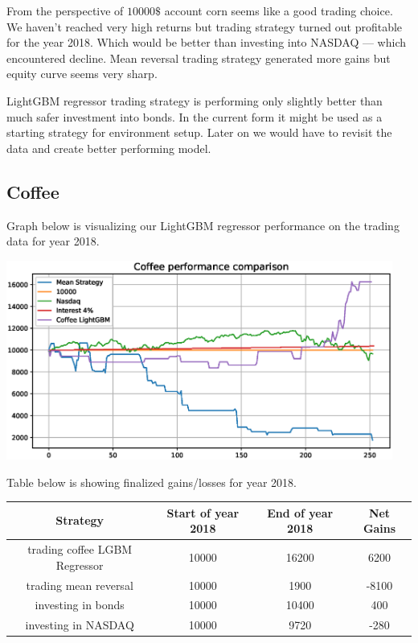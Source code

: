 \documentclass[final,2p]{elsarticle}
\begin{document}
From the perspective of $10000\$$ account corn seems like a good trading choice. We haven't reached
very high returns but trading strategy turned out profitable for the year 2018. Which would be
better than investing into NASDAQ --- which encountered decline. Mean reversal trading strategy generated
more gains but equity curve seems very sharp.

LightGBM regressor trading strategy is performing only slightly better than much safer investment
into bonds. In the current form it might be used as a starting strategy for environment setup.
Later on we would have to revisit the data and create better performing model.

\subsection{Coffee}

Graph below is visualizing our LightGBM regressor performance on the trading data for year 2018.

\begin{center}
\includegraphics[width = 5in]{figures/coffee_benchmark_performance.eps}
\end{center}

Table below is showing finalized gains/losses for year 2018.

\begin{center}
    \begin{tabular}{cccc}
        Strategy & Start of year 2018 & End of year 2018 & Net Gains \\
        \hline
        trading coffee LGBM Regressor & 10000 & 16200 & 6200 \\
        trading mean reversal & 10000 & 1900 & -8100 \\
        investing in bonds & 10000 & 10400 & 400 \\
        investing in NASDAQ & 10000 & 9720 & -280 \\
    \end{tabular}
\end{center}
\end{document}
